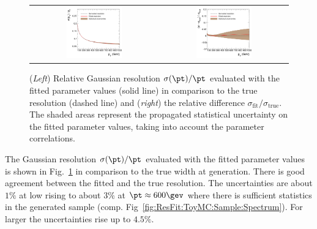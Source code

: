 \begin{figure}[ht]
  \begin{center}
    \begin{tabular}{cc}
     \includegraphics[width=0.45\textwidth]{figures/resFit_ToyMC_PtGenCuts_Sigma} &
     \includegraphics[width=0.45\textwidth]{figures/resFit_ToyMC_PtGenCuts_SigmaRelDifference} \\
   \end{tabular}
 \end{center}
  \caption{(\textit{Left}) Relative Gaussian resolution $\sigma(\pt)/\pt$ evaluated with the fitted
    parameter values (solid line) in comparison to the true resolution
    (dashed line) and (\textit{right}) the relative difference
    $\sigma_{\text{fit}} / \sigma_{\text{true}}$.
    The shaded areas represent the propagated statistical
    uncertainty on the fitted parameter values, taking into account the
    parameter correlations.}
  \label{fig:ResFit:ToyMC:PtGenCuts:FittedSigma}
\end{figure}

The Gaussian resolution $\sigma(\pt)/\pt$ evaluated with the fitted
parameter values is shown in Fig.~\ref{fig:ResFit:ToyMC:PtGenCuts:FittedSigma}
in comparison to the true width at generation.
There is good agreement between the fitted and the true resolution.
The uncertainties are about $1\%$ at low \pt rising to
about $3\%$ at $\pt \approx 600\gev$ where there is sufficient statistics in
the generated sample (comp. Fig~\ref{fig:ResFit:ToyMC:Sample:Spectrum}).
For larger \pt the uncertainties rise up to $4.5\%$.

